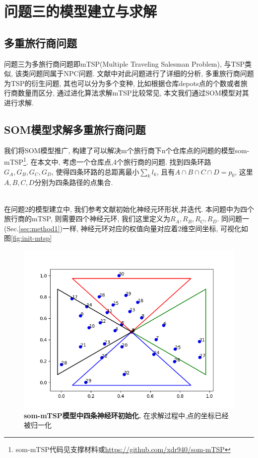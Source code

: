 \section{问题三的模型建立与求解}



\subsection{多重旅行商问题}
问题三为多旅行商问题即mTSP(Multiple Traveling Salesman Problem), 与TSP类似, 该类问题同属于NPC问题. 文献\cite{surveymtsp}中对此问题进行了详细的分析, 多重旅行商问题为TSP的衍生问题, 其也可以分为多个变种, 比如根据仓库depots点的个数或者旅行商数量而区分\cite{mtsp-genetic}, 通过进化算法求解mTSP比较常见\cite{AdlemanTSP,mtsp-genetic}, 本文我们通过SOM模型对其进行求解.



\subsection{SOM模型求解多重旅行商问题}

我们将SOM模型推广, 构建了可以解决m个旅行商下n个仓库点的问题的模型som-mTSP\footnote{som-mTSP代码见支撑材料或\url{https://github.com/xdr940/som-mTSP}}. 在本文中, 考虑一个仓库点,4个旅行商的问题. 找到四条环路$G_A, G_B,G_C,G_D$, 使得四条环路的总距离最小$\sum\limits_k l_k$, 且有$A \cap B \cap C \cap D = {p_0}$, 这里$A,B,C,D$分别为四条路径的点集合.

\\

在问题2的模型建立中, 我们参考文献\cite{isom2008}初始化神经元环形状,并迭代. 本问题中为四个旅行商的mTSP, 则需要四个神经元环, 我们这里定义为$R_A,R_B,R_C,R_D$. 同问题一(Sec.\ref{sec:method1})一样, 神经元环对应的权值向量对应着2维空间坐标, 可视化如图\ref{fig:init-mtsp}
\begin{figure}[h]
    \begin{center}
        \includegraphics[width=0.55\linewidth]{fig/init2}
    \end{center}
    \caption{\textbf{som-mTSP模型中四条神经环初始化.} 在求解过程中,点的坐标已经被归一化 }
        \label{fig:init2}
  \end{figure}

